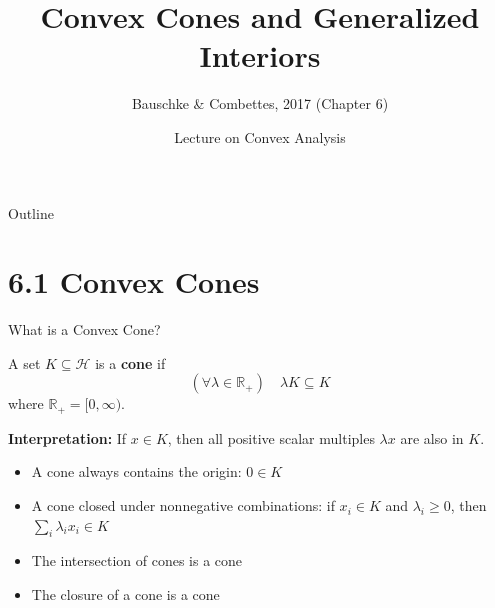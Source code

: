 \documentclass[aspectratio=169,10pt]{beamer}
\title[Chapter 6: Convex Cones]{Convex Cones and Generalized Interiors}
\subtitle{Bauschke \& Combettes, 2017 (Chapter 6)}
\author{Lecture on Convex Analysis}
\institute{Convex Analysis and Monotone Operator Theory}
\date{}
\begin{document}
\begin{frame}
\titlepage
\end{frame}

\begin{frame}{Outline}
\tableofcontents
\end{frame}

\section{6.1 Convex Cones}

\begin{frame}{What is a Convex Cone?}
\begin{definition}
A set $K \subseteq \mathcal{H}$ is a \textbf{cone} if
\[
(\forall \lambda \in \mathbb{R}_+) \quad \lambda K \subseteq K
\]
where $\mathbb{R}_+ = [0, \infty)$.
\end{definition}

\vspace{0.3cm}

\textbf{Interpretation:} If $x \in K$, then all positive scalar multiples $\lambda x$ are also in $K$.

\vspace{0.3cm}

\begin{proposition}
\begin{itemize}
    \item A cone always contains the origin: $0 \in K$
    \item A cone closed under nonnegative combinations: if $x_i \in K$ and $\lambda_i \geq 0$, then $\sum_i \lambda_i x_i \in K$
    \item The intersection of cones is a cone
    \item The closure of a cone is a cone
\end{itemize}
\end{proposition}
\end{frame}
\end{document}

